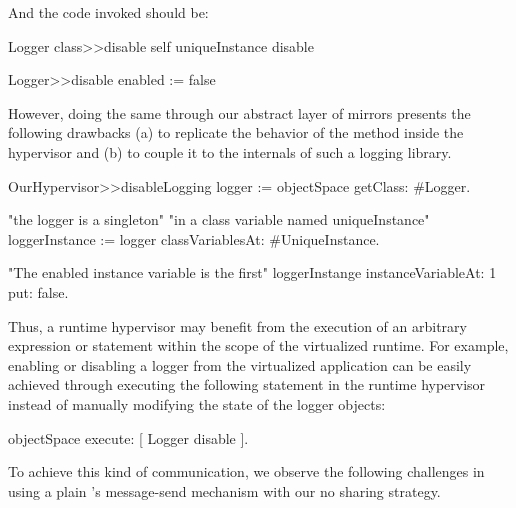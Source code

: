 And the code invoked should be:

\begin{code}
Logger class>>disable
	self uniqueInstance disable
	
Logger>>disable
	enabled := false
\end{code}

However, doing the same through our abstract layer of mirrors presents the following drawbacks (a) to replicate the behavior of the  method inside the hypervisor and (b) to couple it to the internals of such a logging library. 

\begin{code}
OurHypervisor>>disableLogging
	logger := objectSpace getClass: #Logger.

	"the logger is a singleton"
	"in a class variable named uniqueInstance"
	loggerInstance := logger classVariablesAt: #UniqueInstance.

	"The enabled instance variable is the first"
	loggerInstange instanceVariableAt: 1 put: false.
\end{code}

Thus, a runtime hypervisor may benefit from the execution of an arbitrary expression or statement within the scope of the virtualized runtime. For example, enabling or disabling a logger from the virtualized application can be easily achieved through executing the following statement in the runtime hypervisor instead of manually modifying the state of the logger objects:

\begin{code}
objectSpace execute: [ Logger disable ].
\end{code}

To achieve this kind of communication, we observe the following challenges in using a plain \VM's message-send mechanism with our no sharing strategy.


